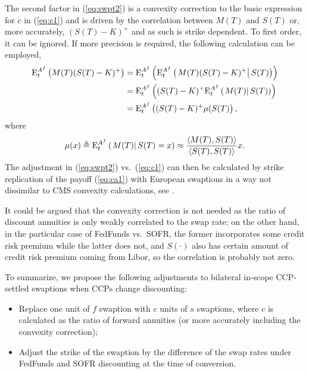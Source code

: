 \documentclass{article}
\begin{document}
The second factor in (\ref{eq:swpt2}) is a convexity correction to the basic
expression for $c$ in (\ref{eq:c1}) and is driven by the correlation between 
$M(T)$ and $S(T)$ or, more accurately, $(S(T)-K)^{+}$ and as such is strike
dependent. To first order, it can be ignored. If more precision is required,
the following calculation can be employed,%
\begin{align}
\mathrm{E}_{t}^{A^{f}}\left( M(T)(S(T)-K)^{+}\right) & =\mathrm{E}%
_{t}^{A^{f}}\left( \mathrm{E}_{t}^{A^{f}}\left( \left.
M(T)(S(T)-K)^{+}\right\vert S(T)\right) \right)  \notag \\
& =\mathrm{E}_{t}^{A^{f}}\left( (S(T)-K)^{+}\mathrm{E}_{t}^{A^{f}}\left(
\left. M(T)\right\vert S(T)\right) \right)  \notag \\
& =\mathrm{E}_{t}^{A^{f}}\left( (S(T)-K)^{+}\mu (S(T)\right) ,
\label{eq:ca1}
\end{align}%
where%
\begin{equation*}
\mu (x)\triangleq \mathrm{E}_{t}^{A^{f}}\left( \left. M(T)\right\vert
S(T)=x\right) \approx \frac{\left\langle M(T),S(T)\right\rangle }{%
\left\langle S(T),S(T)\right\rangle }x.
\end{equation*}%
The adjustment in (\ref{eq:swpt2}) vs.~(\ref{eq:c1}) can then be calculated
by strike replication of the payoff (\ref{eq:ca1}) with European swaptions
in a way not dissimilar to CMS convexity calculations, see \cite{ap-book}.

It could be argued that the convexity correction is not needed as the ratio
of discount annuities is only weakly correlated to the swap rate; on the
other hand, in the particular case of FedFunds vs.~SOFR, the former
incorporates some credit risk premium while the latter does not, and $%
S(\cdot )$ also has certain amount of credit risk premium coming from Libor,
so the correlation is probably not zero.

To summarize, we propose the following adjustments to bilateral in-scope
CCP-settled swaptions when CCPs change discounting:

\begin{itemize}
\item Replace one unit of $f$ swaption with $c$ units of $s$ swaptions,
where $c$ is calculated as the ratio of forward annuities (or more
accurately including the convexity correction);

\item Adjust the strike of the swaption by the difference of the swap rates
under FedFunds and SOFR discounting at the time of conversion.
\end{itemize}
\end{document}
